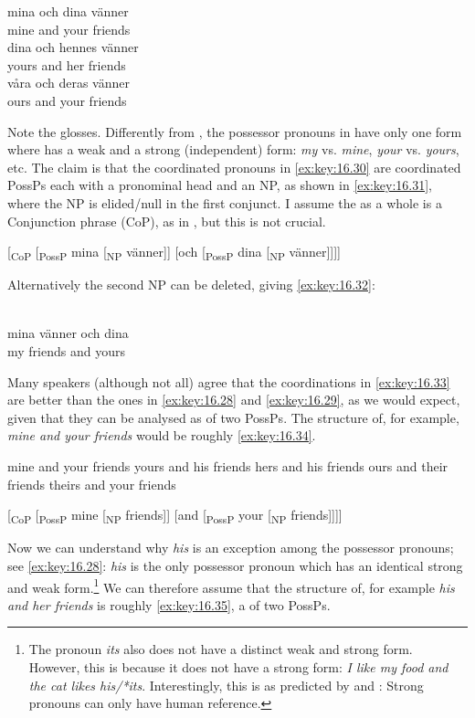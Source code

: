 \documentclass[output=paper]{langsci/langscibook}
\begin{document}
\ea\label{ex:key:16.30}
	\ea
		\gll mina och dina vänner\\
			mine   and  your friends\\
	\ex
		\gll dina och hennes vänner\\
			yours and her friends\\
	\ex
		\gll våra och deras vänner\\
			ours and your friends\\
	\z
\z

Note the glosses. Differently from , the possessor pronouns in 
have only one form where  has a weak and a strong (independent) form:
\emph{my} vs. \emph{mine}, \emph{your} vs. \emph{yours}, etc. The claim is that
the  coordinated pronouns in \eqref{ex:key:16.30} are coordinated PossPs
each with a pronominal head and an NP, as shown in \eqref{ex:key:16.31}, where
the NP is elided/null in the first conjunct. I assume the  as a
whole is a Conjunction phrase (CoP), as in \citet{Johannessen1998}, but this is
not crucial.

\ea\label{ex:key:16.31}
    {}[\textsubscript{CoP} [\textsubscript{PossP} mina [\textsubscript{NP} vänner]] [och [\textsubscript{PossP} dina [\textsubscript{NP} vänner]]]]
\z\newpage

Alternatively the second NP can be deleted, giving \eqref{ex:key:16.32}:

\ea\label{ex:key:16.32}\\
	\gll mina vänner och dina\\
		my friends    and yours\\
\z

Many speakers (although not all) agree that the  coordinations in \eqref{ex:key:16.33}
are better than the ones in \eqref{ex:key:16.28} and \eqref{ex:key:16.29}, as we would expect, given that they
can be analysed as  of two PossPs. The structure of, for example,
\emph{mine and your friends} would be roughly \eqref{ex:key:16.34}.

\ea\label{ex:key:16.33}
	\ea mine and your friends
	\ex yours and his friends
	\ex hers and his friends
	\ex ours and their friends
	\ex theirs and your friends
	\z
\z

\ea\label{ex:key:16.34}
    {}[\textsubscript{CoP} [\textsubscript{PossP} mine [\textsubscript{NP} friends]] [and [\textsubscript{PossP} your [\textsubscript{NP} friends]]]]
\z

Now we can understand why \emph{his} is an exception among the possessor
pronouns; see \eqref{ex:key:16.28}: \emph{his} is the only possessor pronoun which has an
identical strong and weak form.\footnote{ The pronoun \emph{its} also does not
have a distinct weak and strong form. However, this is because it does not have
a strong form: \emph{I like my food and the cat likes his/*its}. Interestingly,
this is as predicted by \citet{Cardinaletti1998} and \citet{CarSta1999}: Strong
pronouns can only have human reference.} We can therefore assume that the
structure of, for example \emph{his and her friends} is roughly
\eqref{ex:key:16.35}, a  of two PossPs.
\end{document}
